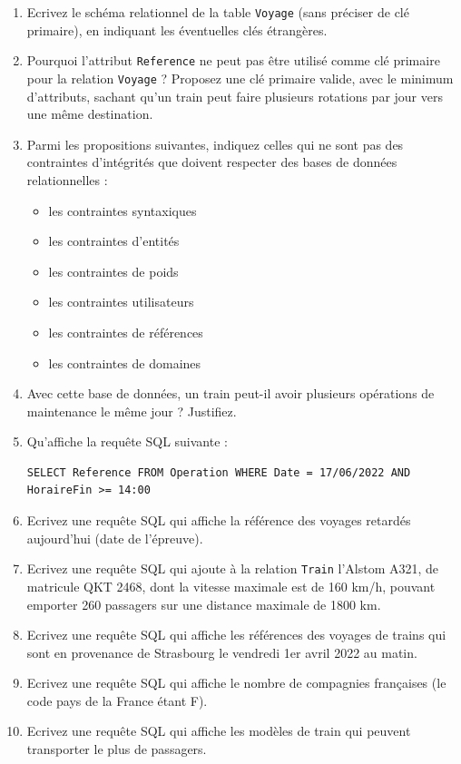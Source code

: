 \documentclass[11pt,a4paper,french,twoside]{PMCours}
\begin{document}
\begin{enumerate}
\item Ecrivez le schéma relationnel de la table \verb'Voyage' (sans préciser de clé primaire), en indiquant les éventuelles clés étrangères.
\item Pourquoi l'attribut \verb'Reference' ne peut pas être utilisé comme clé primaire pour la relation \verb'Voyage' ? Proposez une clé primaire valide, avec le minimum d'attributs, sachant qu'un train peut faire plusieurs rotations par jour vers une même destination.
\item Parmi les propositions suivantes, indiquez celles qui ne sont pas des contraintes d'intégrités que doivent respecter des bases de données relationnelles : 
\begin{itemize}
\item les contraintes syntaxiques %
\item les contraintes d'entités
\item les contraintes de poids %
\item les contraintes utilisateurs
\item les contraintes de références
\item les contraintes de domaines
\end{itemize}
\item Avec cette base de données, un train peut-il avoir plusieurs opérations de maintenance le même jour ? Justifiez.
\item Qu'affiche la requête SQL suivante :
\begin{verbatim}
SELECT Reference FROM Operation WHERE Date = 17/06/2022 AND HoraireFin >= 14:00
\end{verbatim} 
\item Ecrivez une requête SQL qui affiche la référence des voyages retardés aujourd'hui (date de l'épreuve).
\item Ecrivez une requête SQL qui ajoute à la relation \verb'Train' l'Alstom A321, de matricule QKT 2468, dont la vitesse maximale est de 160 km/h, pouvant emporter 260 passagers sur une distance maximale de 1800 km.
\item Ecrivez une requête SQL qui affiche les références des voyages de trains qui sont en provenance de Strasbourg le vendredi 1er avril 2022 au matin.
\item Ecrivez une requête SQL qui affiche le nombre de compagnies françaises (le code pays de la France étant F).
\item Ecrivez une requête SQL qui affiche les modèles de train qui peuvent transporter le plus de passagers.

\end{enumerate}
\end{document}
